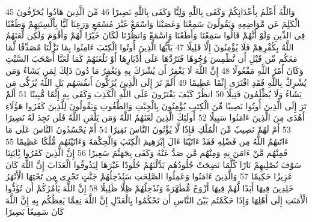 \documentclass[20pt,a4paper]{article}
\begin{document}
{\tiny\colorbox{cl_aya}{45}} وَاللَّهُ أَعْلَمُ بِأَعْدَائِكُمْ وَكَفَى بِاللَّهِ وَلِيًّا وَكَفَى بِاللَّهِ نَصِيرًا
{\tiny\colorbox{cl_aya}{46}} مِّنَ الَّذِينَ هَادُوا يُحَرِّفُونَ الْكَلِمَ عَن مَّوَاضِعِهِ وَيَقُولُونَ سَمِعْنَا وَعَصَيْنَا وَاسْمَعْ غَيْرَ مُسْمَعٍ وَرَعِنَا لَيًّا بِأَلْسِنَتِهِمْ وَطَعْنًا فِى الدِّينِ وَلَوْ أَنَّهُمْ قَالُوا سَمِعْنَا وَأَطَعْنَا وَاسْمَعْ وَانظُرْنَا لَكَانَ خَيْرًا لَّهُمْ وَأَقْوَمَ وَلَكِن لَّعَنَهُمُ اللَّهُ بِكُفْرِهِمْ فَلَا يُؤْمِنُونَ إِلَّا قَلِيلًا
{\tiny\colorbox{cl_aya}{47}} يَأَيُّهَا الَّذِينَ أُوتُوا الْكِتَبَ ءَامِنُوا بِمَا نَزَّلْنَا مُصَدِّقًا لِّمَا مَعَكُم مِّن قَبْلِ أَن نَّطْمِسَ وُجُوهًا فَنَرُدَّهَا عَلَى أَدْبَارِهَا أَوْ نَلْعَنَهُمْ كَمَا لَعَنَّا أَصْحَبَ السَّبْتِ وَكَانَ أَمْرُ اللَّهِ مَفْعُولًا
{\tiny\colorbox{cl_aya}{48}} إِنَّ اللَّهَ لَا يَغْفِرُ أَن يُشْرَكَ بِهِ وَيَغْفِرُ مَا دُونَ ذَلِكَ لِمَن يَشَاءُ وَمَن يُشْرِكْ بِاللَّهِ فَقَدِ افْتَرَى إِثْمًا عَظِيمًا
{\tiny\colorbox{cl_aya}{49}} أَلَمْ تَرَ إِلَى الَّذِينَ يُزَكُّونَ أَنفُسَهُم بَلِ اللَّهُ يُزَكِّى مَن يَشَاءُ وَلَا يُظْلَمُونَ فَتِيلًا
{\tiny\colorbox{cl_aya}{50}} انظُرْ كَيْفَ يَفْتَرُونَ عَلَى اللَّهِ الْكَذِبَ وَكَفَى بِهِ إِثْمًا مُّبِينًا
{\tiny\colorbox{cl_aya}{51}} أَلَمْ تَرَ إِلَى الَّذِينَ أُوتُوا نَصِيبًا مِّنَ الْكِتَبِ يُؤْمِنُونَ بِالْجِبْتِ وَالطَّغُوتِ وَيَقُولُونَ لِلَّذِينَ كَفَرُوا هَؤُلَاءِ أَهْدَى مِنَ الَّذِينَ ءَامَنُوا سَبِيلًا
{\tiny\colorbox{cl_aya}{52}} أُولَئِكَ الَّذِينَ لَعَنَهُمُ اللَّهُ وَمَن يَلْعَنِ اللَّهُ فَلَن تَجِدَ لَهُ نَصِيرًا
{\tiny\colorbox{cl_aya}{53}} أَمْ لَهُمْ نَصِيبٌ مِّنَ الْمُلْكِ فَإِذًا لَّا يُؤْتُونَ النَّاسَ نَقِيرًا
{\tiny\colorbox{cl_aya}{54}} أَمْ يَحْسُدُونَ النَّاسَ عَلَى مَا ءَاتَىهُمُ اللَّهُ مِن فَضْلِهِ فَقَدْ ءَاتَيْنَا ءَالَ إِبْرَهِيمَ الْكِتَبَ وَالْحِكْمَةَ وَءَاتَيْنَهُم مُّلْكًا عَظِيمًا
{\tiny\colorbox{cl_aya}{55}} فَمِنْهُم مَّنْ ءَامَنَ بِهِ وَمِنْهُم مَّن صَدَّ عَنْهُ وَكَفَى بِجَهَنَّمَ سَعِيرًا
{\tiny\colorbox{cl_aya}{56}} إِنَّ الَّذِينَ كَفَرُوا بَِٔايَتِنَا سَوْفَ نُصْلِيهِمْ نَارًا كُلَّمَا نَضِجَتْ جُلُودُهُم بَدَّلْنَهُمْ جُلُودًا غَيْرَهَا لِيَذُوقُوا الْعَذَابَ إِنَّ اللَّهَ كَانَ عَزِيزًا حَكِيمًا
{\tiny\colorbox{cl_aya}{57}} وَالَّذِينَ ءَامَنُوا وَعَمِلُوا الصَّلِحَتِ سَنُدْخِلُهُمْ جَنَّتٍ تَجْرِى مِن تَحْتِهَا الْأَنْهَرُ خَلِدِينَ فِيهَا أَبَدًا لَّهُمْ فِيهَا أَزْوَجٌ مُّطَهَّرَةٌ وَنُدْخِلُهُمْ ظِلًّا ظَلِيلًا
{\tiny\colorbox{cl_aya}{58}} إِنَّ اللَّهَ يَأْمُرُكُمْ أَن تُؤَدُّوا الْأَمَنَتِ إِلَى أَهْلِهَا وَإِذَا حَكَمْتُم بَيْنَ النَّاسِ أَن تَحْكُمُوا بِالْعَدْلِ إِنَّ اللَّهَ نِعِمَّا يَعِظُكُم بِهِ إِنَّ اللَّهَ كَانَ سَمِيعًا بَصِيرًا
\end{document}
